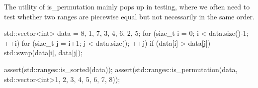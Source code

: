 

The utility of is\_permutation mainly pops up in testing, where we often need to test whether two ranges are piecewise equal but not necessarily in the same order.

\begin{box-note}
\begin{cppcode}
std::vector<int> data = { 8, 1, 7, 3, 4, 6, 2, 5};
for (size_t i = 0; i < data.size()-1; ++i)
    for (size_t j = i+1; j < data.size(); ++j)
        if (data[i] > data[j])
            std::swap(data[i], data[j]);

assert(std::ranges::is_sorted(data));
assert(std::ranges::is_permutation(data, 
                                   std::vector<int>{1, 2, 3, 4, 5, 6, 7, 8}));
\end{cppcode}
\end{box-note}